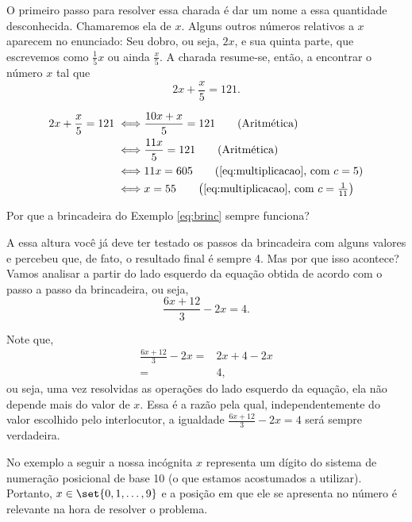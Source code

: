 \begin{solution}
O primeiro passo para resolver essa charada é dar um nome a essa quantidade desconhecida. Chamaremos ela de $x$. Alguns outros números relativos a $x$ aparecem no enunciado: Seu dobro, ou seja, $2x$, e sua quinta parte, que escrevemos como $\frac{1}{5}x$ ou ainda $\frac{x}{5}$. A charada resume-se, então, a encontrar o número $x$ tal que $$2x + \frac{x}{5}  = 121.$$

\begin{align*}
	2x + \frac{x}{5}  = 121 \iff & \frac{10x + x}{5}  = 121 \tag*{(Aritmética)}\\ 
		 \iff & \frac{11x}{5}  = 121 \tag*{(Aritmética)}\\ 
		 \iff & 11x = 605 \tag*{$\left(\text{\ref{eq:multiplicacao}, com } c = 5 \right) $}\\
		 \iff & x = 55 \tag*{$\left(\text{\ref{eq:multiplicacao}, com } c = \frac 1 {11} \right) $}
\end{align*}
\end{solution}

\begin{example}
	Por que a brincadeira do Exemplo \ref{eq:brinc} sempre funciona?
\end{example}

\begin{solution}
	A essa altura você já deve ter testado os passos da brincadeira com alguns valores e percebeu que, de fato, o resultado final é sempre 4. Mas por que isso acontece? Vamos analisar a partir do lado esquerdo da equação obtida de acordo com o passo a passo da brincadeira, ou seja, $$\frac{6x+12}{3} - 2x = 4.$$

	Note que,
	\begin{align*}
		\frac{6x+12}{3} - 2x = & 2x + 4 - 2x  \tag*{(Aritmética)}\\ 
			= & 4, \tag*{(Aritmética)}		
	\end{align*}
	ou seja, uma vez resolvidas as operações do lado esquerdo da equação, ela não depende mais do valor de $x$. Essa é a razão pela qual, independentemente do valor escolhido pelo interlocutor, a igualdade $\frac{6x+12}{3} - 2x = 4$ será sempre verdadeira.
\end{solution}

No exemplo a seguir a nossa incógnita $x$ representa um dígito do sistema de numeração posicional de base 10 (o que estamos acostumados a utilizar). Portanto, $x \in \set{0,1,\ldots, 9}$ e a posição em que ele se apresenta no número é relevante na hora de resolver o problema. 


